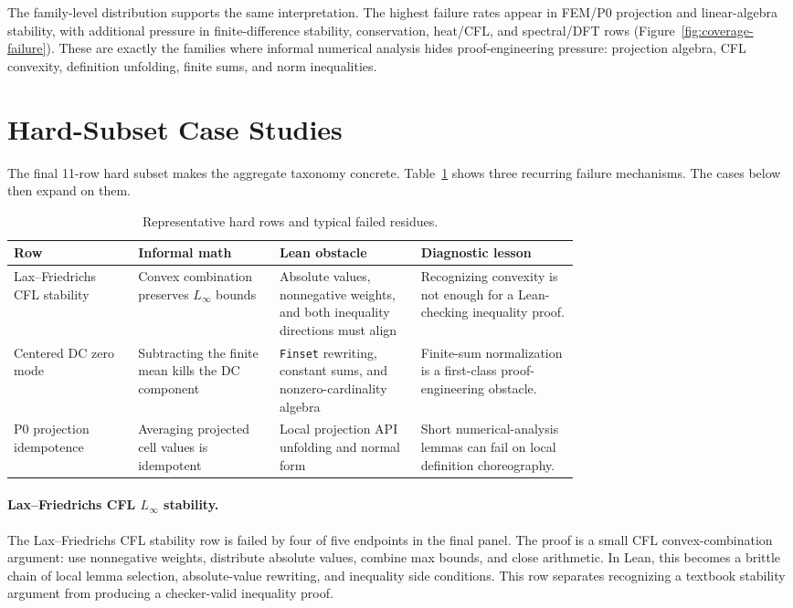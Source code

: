 \documentclass{article}
\begin{document}
The family-level distribution supports the same interpretation. The highest
failure rates appear in FEM/P0 projection and linear-algebra stability, with
additional pressure in finite-difference stability, conservation, heat/CFL, and
spectral/DFT rows (Figure~\ref{fig:coverage-failure}). These are exactly the
families where informal numerical analysis hides proof-engineering pressure:
projection algebra, CFL convexity, definition unfolding, finite sums, and norm
inequalities.

\section{Hard-Subset Case Studies}
\label{sec:case-studies}

The final 11-row hard subset makes the aggregate taxonomy concrete.
Table~\ref{tab:representative-residues} shows three recurring failure
mechanisms. The cases below then expand on them.

\begin{table}[H]
\centering
\caption{Representative hard rows and typical failed residues.}
\label{tab:representative-residues}
\scriptsize
\begin{tabularx}{\linewidth}{
  >{\raggedright\arraybackslash}p{0.22\linewidth}
  >{\raggedright\arraybackslash}p{0.25\linewidth}
  >{\raggedright\arraybackslash}p{0.25\linewidth}
  >{\raggedright\arraybackslash}X}
\toprule
Row & Informal math & Lean obstacle & Diagnostic lesson\\
\midrule
Lax--Friedrichs CFL stability & Convex combination preserves
\(L_\infty\) bounds & Absolute values, nonnegative weights, and both
inequality directions must align & Recognizing convexity is not enough for a
Lean-checking inequality proof.\\
Centered DC zero mode & Subtracting the finite mean kills the DC component &
\texttt{Finset} rewriting, constant sums, and nonzero-cardinality algebra &
Finite-sum normalization is a first-class proof-engineering obstacle.\\
P0 projection idempotence & Averaging projected cell values is idempotent &
Local projection API unfolding and normal form & Short numerical-analysis
lemmas can fail on local definition choreography.\\
\bottomrule
\end{tabularx}
\end{table}

\paragraph{Lax--Friedrichs CFL $L_\infty$ stability.}
The Lax--Friedrichs CFL stability row is failed by four of five endpoints in the
final panel. The proof is a small CFL convex-combination argument: use
nonnegative weights, distribute absolute values, combine max bounds, and close
arithmetic. In Lean, this becomes a brittle chain of local lemma selection,
absolute-value rewriting, and inequality side conditions. This row separates
recognizing a textbook stability argument from producing a checker-valid
inequality proof.
\end{document}
